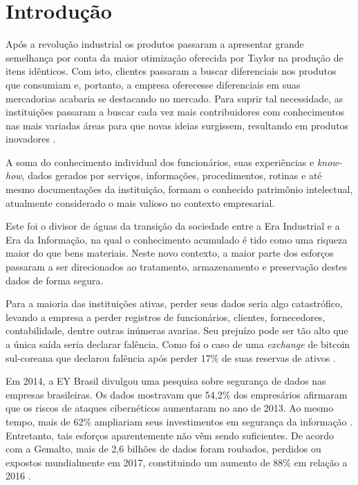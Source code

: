 \documentclass[12pt]{article}
\begin{document}
  
    \section{Introdução}
  
        Após a revolução industrial os produtos passaram a apresentar grande semelhança por conta da maior otimização oferecida por Taylor na produção de itens idênticos. Com isto, clientes passaram a buscar diferenciais nos produtos que consumiam e, portanto, a empresa oferecesse diferenciais em suas mercadorias acabaria se destacando no mercado. Para suprir tal necessidade, as instituições passaram a buscar cada vez mais contribuidores com conhecimentos nas mais variadas áreas para que novas ideias surgissem, resultando em produtos inovadores \cite{thereza2002capital}.
    
        A soma do conhecimento individual dos funcionários, suas experiências e \textit{know-how}, dados gerados por serviços, informações, procedimentos, rotinas e até mesmo documentações da instituição, formam o conhecido patrimônio intelectual, atualmente considerado o mais valioso no contexto empresarial.
    
        Este foi o divisor de águas da transição da sociedade entre a Era Industrial e a Era da Informação, na qual o conhecimento acumulado é tido como uma riqueza maior do que bens materiais. Neste novo contexto, a maior parte dos esforços passaram a ser direcionados ao tratamento, armazenamento e preservação destes dados de forma segura.
    
        Para a maioria das instituições ativas, perder seus dados seria algo catastrófico, levando a empresa a perder registros de funcionários, clientes, fornecedores, contabilidade, dentre outras inúmeras avarias. Seu prejuízo pode ser tão alto que a única saída seria declarar falência. Como foi o caso de uma \textit{exchange} de bitcoin sul-coreana que declarou falência após perder 17\% de suas reservas de ativos \cite{falencia2017tolotti}.
    
        Em 2014, a EY Brasil divulgou uma pesquisa sobre segurança de dados nas empresas brasileiras. Os dados mostravam que 54,2\% dos empresários afirmaram que os riscos de ataques cibernéticos aumentaram no ano de 2013. Ao mesmo tempo, mais de 62\% ampliariam seus investimentos em segurança da informação \cite{canal2014roubo}. Entretanto, tais esforços aparentemente não vêm sendo suficientes. De acordo com a Gemalto, mais de 2,6 bilhões de dados foram roubados, perdidos ou expostos mundialmente em 2017, constituindo um aumento de 88\% em relação a 2016 \cite{computer2017roubo}.
    
\end{document}
